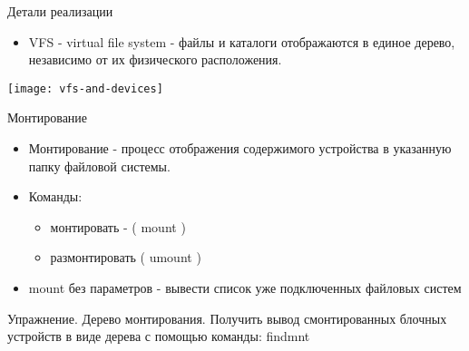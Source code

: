 
\begin{frame}{Детали реализации}
  \begin{itemize}
    \item \alert{VFS - virtual file system} - файлы и каталоги отображаются в единое дерево, независимо от их физического расположения.
  \end{itemize}
  \texttt{[image: vfs-and-devices]}
\end{frame}

\begin{frame}{Монтирование}
  \begin{itemize}
    \item \alert{Монтирование} - процесс отображения содержимого устройства в указанную папку файловой системы.
    \item Команды:
      \begin{itemize}
        \item монтировать - ( \alert{mount} ) 
        \item размонтировать ( \alert{umount} )
      \end{itemize}
    \item \alert{mount} без параметров - вывести список уже подключенных файловых систем
  \end{itemize}
      \begin{block}{Упражнение. Дерево монтирования.}
     Получить вывод смонтированных блочных устройств в виде дерева с помощью команды: \alert{findmnt}
      \end{block}
  
\end{frame}

